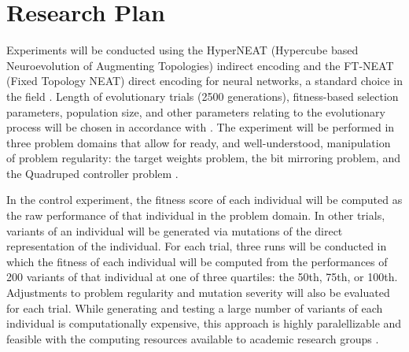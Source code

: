 \section{Research Plan}

Experiments will be conducted using the HyperNEAT (Hypercube based Neuroevolution of Augmenting Topologies) indirect encoding and the FT-NEAT (Fixed Topology NEAT) direct encoding for neural networks, a standard choice in the field \cite{Stanley2009ANetworks,Clune2011OnRegularity}. Length of evolutionary trials (2500 generations), fitness-based selection parameters, population size, and other parameters relating to the evolutionary process will be chosen in accordance with \cite{Clune2011OnRegularity}. The experiment will be performed in three problem domains that allow for ready, and well-understood, manipulation of problem regularity: the target weights problem, the bit mirroring problem, and the Quadruped controller problem \cite{Clune2011OnRegularity}. 

In the control experiment, the fitness score of each individual will be computed as the raw performance of that individual in the problem domain. In other trials, variants of an individual will be generated via mutations of the direct representation of the individual. For each trial, three runs will be conducted in which the fitness of each individual will be computed from the performances of 200 variants of that individual at one of three quartiles: the 50th, 75th, or 100th. Adjustments to problem regularity and mutation severity will also be evaluated for each trial. While generating and testing a large number of variants of each individual is computationally expensive, this approach is highly paralellizable and feasible with the computing resources available to academic research groups \cite{Mengistu2016EvolvabilityIt}.

